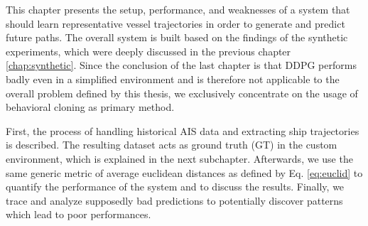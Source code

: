 This chapter presents the setup, performance, and weaknesses of a system that should learn representative vessel trajectories in order to generate and predict future paths. The overall system is built based on the findings of the synthetic experiments, which were deeply discussed in the previous chapter \ref{chap:synthetic}. Since the conclusion of the last chapter is that DDPG performs badly even in a simplified environment and is therefore not applicable to the overall problem defined by this thesis, we exclusively concentrate on the usage of behavioral cloning as primary method. 
\par
First, the process of handling historical AIS data and extracting ship trajectories is described. The resulting dataset acts as ground truth (GT) in the custom environment, which is explained in the next subchapter. Afterwards, we use the same generic metric of average euclidean distances as defined by Eq. \ref{eq:euclid} to quantify the performance of the system and to discuss the results. Finally, we trace and analyze supposedly bad predictions to potentially discover patterns which lead to poor performances.